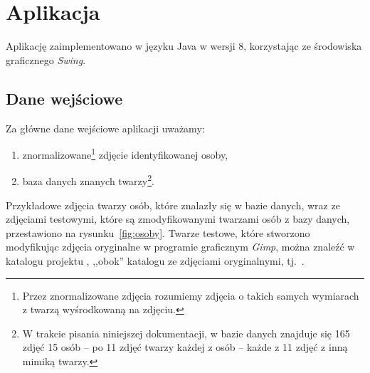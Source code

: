 \documentclass[a4paper,titlepage]{article}
\theoremstyle{break}
\numberwithin{equation}{subsection}
\begin{document}

\section{Aplikacja}
\label{sec:aplikacja}

Aplikację zaimplementowano w języku Java w wersji 8, korzystając ze środowiska graficznego \emph{Swing}.


\subsection{Dane wejściowe}

Za główne dane wejściowe aplikacji uważamy:
\begin{enumerate}
	\item znormalizowane\footnote{Przez znormalizowane zdjęcia rozumiemy zdjęcia o takich samych wymiarach z twarzą wyśrodkowaną na zdjęciu.} zdjęcie identyfikowanej osoby,
	\item baza danych znanych twarzy\footnote{W trakcie pisania niniejszej dokumentacji, w bazie danych znajduje się 165 zdjęć 15 osób -- po 11 zdjęć twarzy każdej z osób -- każde z 11 zdjęć z inną mimiką twarzy.}.
\end{enumerate}
Przykładowe zdjęcia twarzy osób, które znalazły się w bazie danych, wraz ze zdjęciami testowymi, które są zmodyfikowanymi twarzami osób z bazy danych, przestawiono na rysunku~\ref{fig:osoby}. Twarze testowe, które stworzono modyfikując zdjęcia oryginalne w programie graficznym \emph{Gimp}, można znaleźć w katalogu projektu , ,,obok'' katalogu ze zdjęciami oryginalnymi, tj.~.
\end{document}

